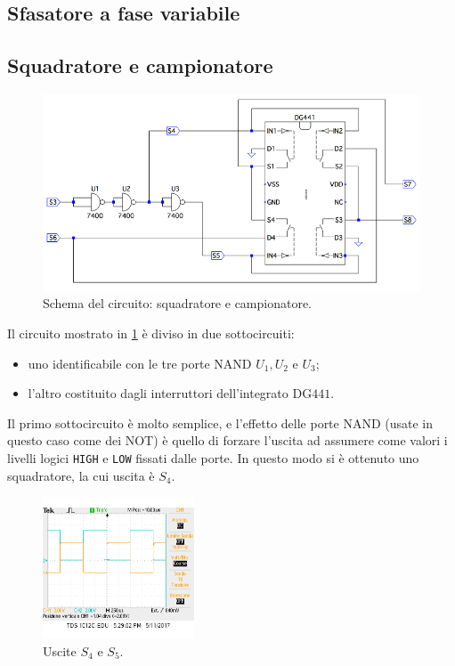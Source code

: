 \documentclass[a4paper,10pt]{article}
\def\code#1{\texttt{#1}}
\begin{document}
\subsection{Sfasatore a fase variabile}

\subsection{Squadratore e campionatore}

\begin{figure}[H]
	\centering
	\includegraphics[width=\textwidth]{../grafici/SqSamp.png}
	\caption{Schema del circuito: squadratore e campionatore.}
	\label{fig:sqsamp}
\end{figure}

Il circuito mostrato in \cref{fig:sqsamp} è diviso in due sottocircuiti:
\begin{itemize}
	\item uno identificabile con le tre porte NAND $ U_1, U_2 $ e $ U_3 $;
	\item l'altro costituito dagli interruttori dell'integrato DG$ 441 $.
\end{itemize}

Il primo sottocircuito è molto semplice, e l'effetto delle porte NAND (usate in questo caso come dei NOT) è quello di forzare l'uscita ad assumere come valori i livelli logici \code{HIGH} e \code{LOW} fissati dalle porte.
In questo modo si è ottenuto uno squadratore, la cui uscita è $ S_4 $.

\begin{figure}
	\vspace{-10pt}
	\centering
	\includegraphics[width=0.4\textwidth]{../grafici/s4s5.png}
	\vspace{-12pt}
	\caption{Uscite $ S_4 $ e $ S_5 $.}
	\label{fig:s4s5}
	\vspace{-12pt}
\end{figure}
\end{document}

